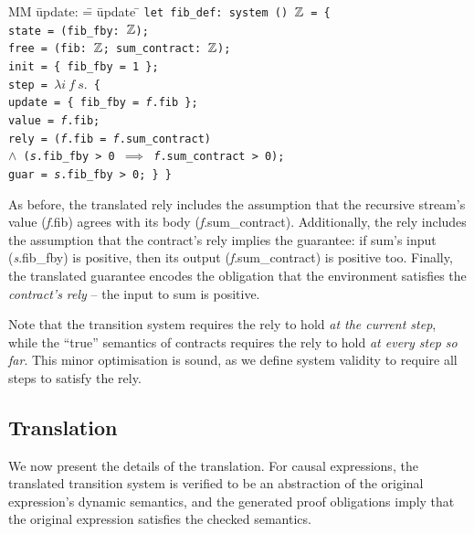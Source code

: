 \documentclass[a4paper,UKenglish,cleveref, autoref, thm-restate,anonymous]{lipics-v2021}
\begin{document}
  \begin{tabbing}
  MM \= update: \= = \= update \= \kill
  \tt{let} fib_def: system () $\mathbb{Z}$ = \{ \\
  \> state   \> = (fib_fby: $\mathbb{Z}$); \\
  \> free  \> = (fib: $\mathbb{Z}$; sum_contract: $\mathbb{Z}$); \\
  \> init  \> = \{ fib_fby = 1 \}; \\
  \> step  \> = $\lambda{} i~f~s.$ \{ \\
  \> \> \> update \> = \{ fib_fby = \textit{f}.fib \}; \\
  \> \> \> value  \> = \textit{f}.fib; \\
  \> \> \> rely   \> = (\textit{f}.fib = \textit{f}.sum_contract) \\
  \> \> \>        \> $\wedge$ (\textit{s}.fib_fby > 0 $\implies$ \textit{f}.sum_contract > 0); \\
  \> \> \> guar   \> = \textit{s}.fib_fby > 0; \} \}
  \end{tabbing}

As before, the translated rely includes the assumption that the recursive stream's value (\textit{f}.fib) agrees with its body (\textit{f}.sum_contract).
Additionally, the rely includes the assumption that the contract's rely implies the guarantee: if sum's input (\textit{s}.fib_fby) is positive, then its output (\textit{f}.sum_contract) is positive too.
Finally, the translated guarantee encodes the obligation that the environment satisfies the \emph{contract's rely} -- the input to sum is positive.

Note that the transition system requires the rely to hold \emph{at the current step}, while the ``true'' semantics of contracts requires the rely to hold \emph{at every step so far}.
This minor optimisation is sound, as we define system validity to require all steps to satisfy the rely.

\subsection{Translation}

We now present the details of the translation.
For causal expressions, the translated transition system is verified to be an abstraction of the original expression's dynamic semantics, and the generated proof obligations imply that the original expression satisfies the checked semantics.
\end{document}
